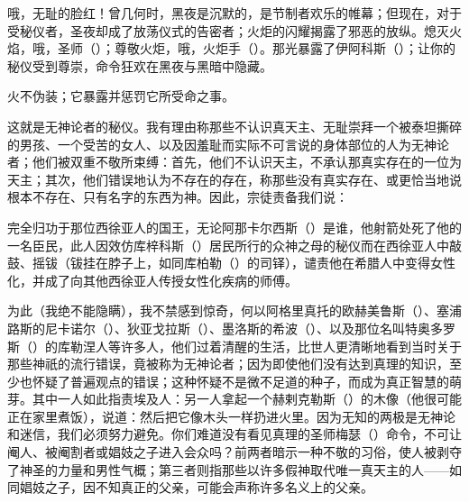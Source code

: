 哦，无耻的脸红！曾几何时，黑夜是沉默的，是节制者欢乐的帷幕；但现在，对于受秘仪者，圣夜却成了放荡仪式的告密者；火炬的闪耀揭露了邪恶的放纵。熄灭火焰，哦，圣师（）；尊敬火炬，哦，火炬手（）。那光暴露了伊阿科斯（）；让你的秘仪受到尊崇，命令狂欢在黑夜与黑暗中隐藏。\par

火不伪装；它暴露并惩罚它所受命之事。\par

这就是无神论者的秘仪。我有理由称那些不认识真天主、无耻崇拜一个被泰坦撕碎的男孩、一个受苦的女人、以及因羞耻而实际不可言说的身体部位的人为无神论者；他们被双重不敬所束缚：首先，他们不认识天主，不承认那真实存在的一位为天主；其次，他们错误地认为不存在的存在，称那些没有真实存在、或更恰当地说根本不存在、只有名字的东西为神。因此，宗徒责备我们说：\par

完全归功于那位西徐亚人的国王，无论阿那卡尔西斯（）是谁，他射箭处死了他的一名臣民，此人因效仿库梓科斯（）居民所行的众神之母的秘仪而在西徐亚人中敲鼓、摇钹（钹挂在脖子上，如同库柏勒（）的司铎），谴责他在希腊人中变得女性化，并成了向其他西徐亚人传授女性化疾病的师傅。\par

为此（我绝不能隐瞒），我不禁感到惊奇，何以阿格里真托的欧赫美鲁斯（）、塞浦路斯的尼卡诺尔（）、狄亚戈拉斯（）、墨洛斯的希波（）、以及那位名叫特奥多罗斯（）的库勒涅人等许多人，他们过着清醒的生活，比世人更清晰地看到当时关于那些神祇的流行错误，竟被称为无神论者；因为即使他们没有达到真理的知识，至少也怀疑了普遍观点的错误；这种怀疑不是微不足道的种子，而成为真正智慧的萌芽。其中一人如此指责埃及人：另一人拿起一个赫剌克勒斯（）的木像（他很可能正在家里煮饭），说道：然后把它像木头一样扔进火里。因为无知的两极是无神论和迷信，我们必须努力避免。你们难道没有看见真理的圣师梅瑟（）命令，不可让阉人、被阉割者或娼妓之子进入会众吗？前两者暗示一种不敬的习俗，使人被剥夺了神圣的力量和男性气概；第三者则指那些以许多假神取代唯一真天主的人——如同娼妓之子，因不知真正的父亲，可能会声称许多名义上的父亲。\par

